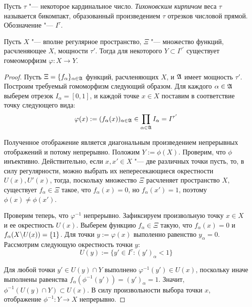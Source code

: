 \begin{definition}
    Пусть $\tau$ "--- некоторое кардинальное число. \textit{Тихоновским кирпичом} веса $\tau$ называется бикомпакт, образованный произведением $\tau$ отрезков числовой прямой. Обозначение "--- $I^{\tau}$.
\end{definition}

\begin{proposition}\label{thm2prop2}
    Пусть $X$ "--- вполне регулярное пространство, $\Xi$ "--- множество фун\-кций, расчленяющее $X$, мощности $\tau'$. Тогда для некоторого $Y \subset I^{\tau'}$ существует гомеоморфизм $\varphi: X \rightarrow Y$.
\end{proposition}

\begin{proof}
    Пусть $\Xi = \lbrace f_\alpha\rbrace_{\alpha \in \mathfrak A}$ функций, расчленяющих $X$, и $\mathfrak A$ имеет мощность $\tau'$. Построим требуемый гомоморфизм следующий образом. Для каждого $\alpha \in \mathfrak A$ выберем отрезок $I_\alpha = [0, 1]$, и каждой точке $x\in X$ поставим в соответствие точку следующего вида:
    \[\varphi(x) := (f_\alpha(x))_{\alpha \in \mathfrak A} \in \prod_{\alpha \in \mathfrak A}I_\alpha = I^{\tau'}\]
    
    Полученное отображение является диагональным произведением непрерывных отображений и потому непрерывно. Положим $Y := \phi(X)$. Проверим, что $\phi$ инъективно. Действительно, если $x, x' \in X$ "--- две различных точки пусть, то, в силу регулярности, можно выбрать их непересекающиеся окрестности $U(x), U'(x)$, тогда, поскольку множество $\Xi$ расчленяет пространство $X$, существует $f_\alpha \in \Xi$ такое, что $f_\alpha(x) = 0$, но $f_\alpha(x') = 1$, поэтому $\phi(x) \ne \phi(x')$.

    Проверим теперь, что $\varphi^{-1}$ непрерывно. Зафиксируем произвольную точку $x \in X$ и ее окрестность $U(x)$. Выберем функцию $f_\alpha \in \Xi$ такую, что $f_\alpha(x) = 0$ и ${f_\alpha(X \backslash U(x)) = \{1\}}$. Для точки $y := \varphi(x)$ выполенно равенство $y_\alpha= 0$. Рассмотрим следующую окрестность точки $y$:
    \[U(y) := \{y' \in I^\tau: (y')_\alpha < 1\}\]
    
    Для любой точки $y' \in U(y) \cap Y$ выполнено $\varphi^{-1}(y') \in U(x)$, поскольку иначе выполнены равенства $f_\alpha(\phi^{-1}(y')) = (y')_\alpha = 1$. Значит, $\phi^{-1}(U(y) \cap Y) \subset U(x)$. В силу произвольности выбора точки $x$, отображение $\phi^{-1} : Y \to X$ непрерывно.
\end{proof}

